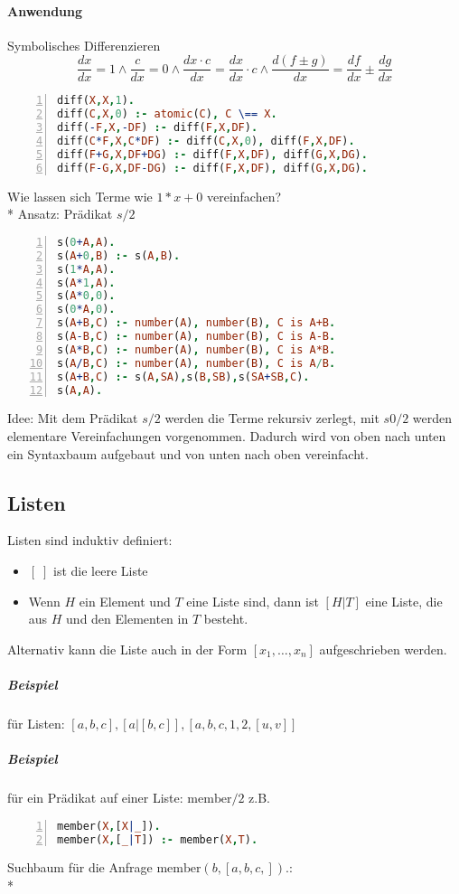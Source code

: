 \documentclass[a4paper]{scrartcl}
\begin{document}
\paragraph{Anwendung} Symbolisches Differenzieren \[\frac{dx}{dx} = 1 \wedge \frac{c}{dx} = 0 \wedge \frac{dx \cdot c}{dx} = \frac{dx}{dx} \cdot c \wedge \frac{d(f\pm g)}{dx} = \frac{df}{dx} \pm \frac{dg}{dx}\]
\begin{lstlisting}[numbers=left, tabsize=4, language=Prolog]
diff(X,X,1).
diff(C,X,0) :- atomic(C), C \== X.
diff(-F,X,-DF) :- diff(F,X,DF).
diff(C*F,X,C*DF) :- diff(C,X,0), diff(F,X,DF).
diff(F+G,X,DF+DG) :- diff(F,X,DF), diff(G,X,DG).
diff(F-G,X,DF-DG) :- diff(F,X,DF), diff(G,X,DG).
\end{lstlisting}
Wie lassen sich Terme wie $1*x+0$ vereinfachen?\\*
Ansatz: Prädikat $s/2$
\begin{lstlisting}[numbers=left, tabsize=4, language=Prolog]
s(0+A,A).
s(A+0,B) :- s(A,B).
s(1*A,A).
s(A*1,A).
s(A*0,0).
s(0*A,0).
s(A+B,C) :- number(A), number(B), C is A+B.
s(A-B,C) :- number(A), number(B), C is A-B.
s(A*B,C) :- number(A), number(B), C is A*B.
s(A/B,C) :- number(A), number(B), C is A/B.
s(A+B,C) :- s(A,SA),s(B,SB),s(SA+SB,C).
s(A,A).
\end{lstlisting}
Idee: Mit dem Prädikat $s/2$ werden die Terme rekursiv zerlegt, mit $s0/2$ werden elementare Vereinfachungen vorgenommen. Dadurch wird von oben nach unten ein Syntaxbaum aufgebaut und von unten nach oben vereinfacht.

\subsection{Listen}
Listen sind induktiv definiert:
\begin{itemize}
\item $[\; ]$ ist die leere Liste
\item Wenn $H$ ein Element und $T$ eine Liste sind, dann ist $[H|T]$ eine Liste, die aus $H$ und den Elementen in $T$ besteht.
\end{itemize}
Alternativ kann die Liste auch in der Form $[x_1,\dots,x_n]$ aufgeschrieben werden.
\subparagraph{Beispiel} für Listen: $[a,b,c], [a|[b,c]], [a,b,c,1,2,[u,v]]$
\subparagraph{Beispiel} für ein Prädikat auf einer Liste: $\text{member} /2$ z.B. 
\begin{lstlisting}[numbers=left, tabsize=4, language=Prolog]
member(X,[X|_]).
member(X,[_|T]) :- member(X,T).
\end{lstlisting}
Suchbaum für die Anfrage $\text{member}(b,[a,b,c,]).$:\\*
\end{document}
